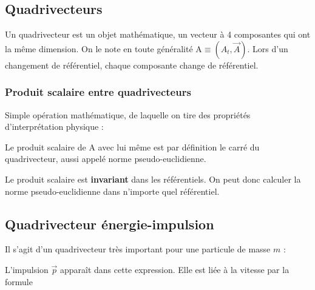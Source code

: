 \documentclass[11pt]{book}
\begin{document}
\subsection{Quadrivecteurs}
Un quadrivecteur est un objet mathématique, un vecteur à 4 composantes qui ont la même dimension. On le note en toute généralité $\mathrm{A} \equiv (A_t, \vec{A})$. Lors d'un changement de référentiel, chaque composante change de référentiel.

\subsubsection{Produit scalaire entre quadrivecteurs}
Simple opération mathématique, de laquelle on tire des propriétés d'interprétation physique :

Le produit scalaire de $\mathrm{A}$ avec lui même est par définition le carré du quadrivecteur, aussi appelé norme pseudo-euclidienne.


Le produit scalaire est \textbf{invariant} dans les référentiels. On peut donc calculer la norme pseudo-euclidienne dans n'importe quel référentiel.
\subsection{Quadrivecteur énergie-impulsion}
Il s'agit d'un quadrivecteur très important pour une particule de masse $m$ :

L'impulsion $\vec{p}$ apparaît dans cette expression. Elle est liée à la vitesse par la formule
\end{document}
